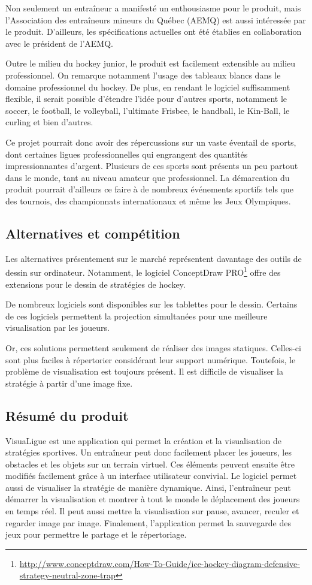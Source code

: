 Non seulement un entraîneur a manifesté un enthousiasme pour le produit, mais l'Association des entraîneurs mineurs du Québec (AEMQ) est aussi intéressée par le produit. D'ailleurs, les spécifications actuelles ont été établies en collaboration avec le président de l'AEMQ.

Outre le milieu du hockey junior, le produit est facilement extensible au milieu professionnel. On remarque notamment l'usage des tableaux blancs dans le domaine professionnel du hockey. De plus, en rendant le logiciel suffisamment flexible, il serait possible d'étendre l'idée pour d'autres sports, notamment le soccer, le football, le volleyball, l'ultimate Frisbee, le handball, le Kin-Ball, le curling et bien d'autres.

Ce projet pourrait donc avoir des répercussions sur un vaste éventail de sports, dont certaines ligues professionnelles qui engrangent des quantités impressionnantes d'argent. Plusieurs de ces sports sont présents un peu partout dans le monde, tant au niveau amateur que professionnel. La démarcation du produit pourrait d'ailleurs ce faire à de nombreux événements sportifs tels que des tournois, des championnats internationaux et même les Jeux Olympiques.

\subsection{Alternatives et compétition}
Les alternatives présentement sur le marché représentent davantage des outils de dessin sur ordinateur. Notamment, le logiciel ConceptDraw PRO\footnote{\url{http://www.conceptdraw.com/How-To-Guide/ice-hockey-diagram-defensive-strategy-neutral-zone-trap}} offre des extensions pour le dessin de stratégies de hockey.

De nombreux logiciels sont disponibles sur les tablettes pour le dessin. Certains de ces logiciels permettent la projection simultanées pour une meilleure visualisation par les joueurs.

Or, ces solutions permettent seulement de réaliser des images statiques. Celles-ci sont plus faciles à répertorier considérant leur support numérique. Toutefois, le problème de visualisation est toujours présent. Il est difficile de visualiser la stratégie à partir d'une image fixe.

\subsection{Résumé du produit}
VisuaLigue est une application qui permet la création et la visualisation de stratégies sportives. Un entraîneur peut donc facilement placer les joueurs, les obstacles et les objets sur un terrain virtuel. Ces éléments peuvent ensuite être modifiés facilement grâce à un interface utilisateur convivial. Le logiciel permet aussi de visualiser la stratégie de manière dynamique. Ainsi, l'entraîneur peut démarrer la visualisation et montrer à tout le monde le déplacement des joueurs en temps réel. Il peut aussi mettre la visualisation sur pause, avancer, reculer et regarder image par image. Finalement, l'application permet la sauvegarde des jeux pour permettre le partage et le répertoriage.

